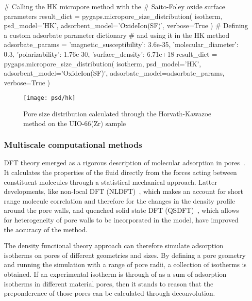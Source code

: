 \begin{python}[float=htb, caption={Using the HK method for PSD},%
    label={pyg:lst:hkpsd}]
# Calling the HK micropore method with the 
# Saito-Foley oxide surface parameters
result_dict = pygaps.micropore_size_distribution(
    isotherm,
    psd_model='HK',
    adsorbent_model='OxideIon(SF)',
    verbose=True
)
# Defining a custom adsorbate parameter dictionary 
# and using it in the HK method
adsorbate_params = {
    'magnetic_susceptibility': 3.6e-35,
    'molecular_diameter': 0.3,
    'polarizability': 1.76e-30,
    'surface_density': 6.71e+18
}
result_dict = pygaps.micropore_size_distribution(
    isotherm,
    psd_model='HK',
    adsorbent_model='OxideIon(SF)',
    adsorbate_model=adsorbate_params,
    verbose=True
)
\end{python}

\begin{figure}[!htb]
	\texttt{[image: psd/hk]}
	\caption{Pore size distribution calculated through the Horvath-Kawazoe method on the UIO-66(Zr) sample}%
	\label{fig:pyg:fig:hk}
\end{figure}

\subsubsection{Multiscale computational methods}

DFT theory emerged as a rigorous description of molecular
adsorption in pores~\cite{seatonNewAnalysisMethod1989}. 
It calculates the properties of the fluid
directly from the forces acting between constituent molecules
through a statistical mechanical approach. Latter developments,
like non-local DFT (NLDFT)~\cite{tarazonaPhaseEquilibriaFluid1987}, 
which makes an account for short range molecule correlation
and therefore for the changes in the density profile
around the pore walls, and quenched solid state DFT 
(QSDFT)~\cite{neimarkQuenchedSolidDensity2009}, which allows for 
heterogeneity of pore walls to be incorporated in the model,
have improved the accuracy of the method.

The density functional theory approach can therefore simulate 
adsorption isotherms on pores of different geometries and sizes. 
By defining a pore geometry and running the simulation with a 
range of pore radii, a collection of isotherms is obtained. 
If an experimental isotherm is through of as a sum of 
adsorption isotherms in different material pores, then it stands 
to reason that the preponderence of those pores can be calculated
through deconvolution.

